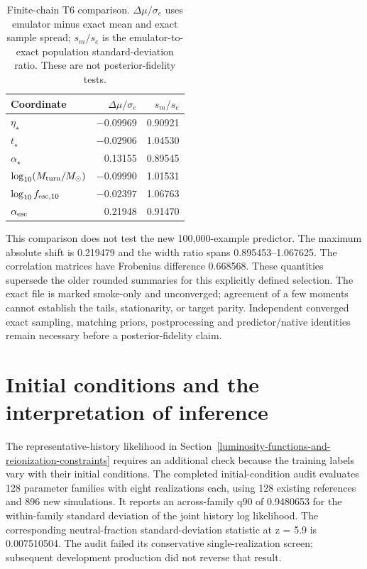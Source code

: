 \begin{table}[t]\centering\small
\caption{Finite-chain T6 comparison. $\Delta\mu/\sigma_e$ uses emulator minus exact mean and exact sample spread; $s_m/s_e$ is the emulator-to-exact population standard-deviation ratio. These are not posterior-fidelity tests.}\label{tab:t6}
\begin{tabular}{lrr}\toprule
Coordinate & $\Delta\mu/\sigma_e$ & $s_m/s_e$\\\midrule
$\eta_\star$ & $-0.09969$ & 0.90921\\
$t_\star$ & $-0.02906$ & 1.04530\\
$\alpha_\star$ & 0.13155 & 0.89545\\
$\log_{10}(M_{\rm turn}/M_\odot)$ & $-0.09990$ & 1.01531\\
$\log_{10}f_{{\rm esc},10}$ & $-0.02397$ & 1.06763\\
$\alpha_{\rm esc}$ & 0.21948 & 0.91470\\\bottomrule
\end{tabular}\end{table}

This comparison does not test the new 100,000-example predictor. The maximum absolute shift is 0.219479 and the width ratio spans 0.895453--1.067625. The correlation matrices have Frobenius difference 0.668568. These quantities supersede the older rounded summaries for this explicitly defined selection. The exact file is marked smoke-only and unconverged; agreement of a few moments cannot establish the tails, stationarity, or target parity. Independent converged exact sampling, matching priors, postprocessing and predictor/native identities remain necessary before a posterior-fidelity claim.



\section{Initial conditions and the interpretation of inference}\label{initial-condition-scatter-and-limits-of-inference}

The representative-history likelihood in Section~\ref{luminosity-functions-and-reionization-constraints} requires an additional check because the training labels vary with their initial conditions. The completed initial-condition audit evaluates 128 parameter families with eight realizations each, using 128 existing references and 896 new simulations. It reports an across-family q90 of 0.9480653 for the within-family standard deviation of the joint history log likelihood. The corresponding neutral-fraction standard-deviation statistic at z = 5.9 is 0.007510504. The audit failed its conservative single-realization screen; subsequent development production did not reverse that result.

